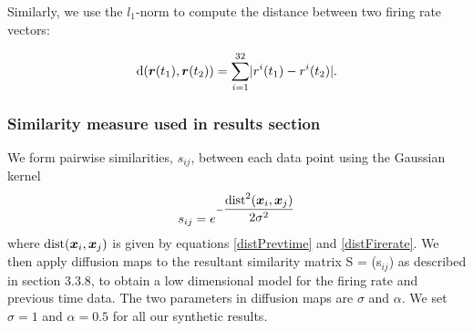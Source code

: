 Similarly, we use the $l_{1}$-norm to compute the distance between two firing rate vectors:

\begin{equation}\label{distFirerate}
\text{d}(\boldsymbol{r}(t_{1}), \boldsymbol{r}(t_{2}) ) = 
\displaystyle \sum_{i=1}^{32} \lvert r^{i}(t_{1}) - r^{i}(t_{2})   \rvert.
\end{equation}


\subsubsection{Similarity measure used in results section}
We form pairwise similarities, $s_{ij}$, between each data point
using the Gaussian kernel 
\[
s_{ij} = e^{-\dfrac{\text{dist}^{2}(\boldsymbol{x}_{i}, \boldsymbol{x}_{j})}{2\sigma^2}} 
\]
where $\text{dist}(\boldsymbol{x}_{i}, \boldsymbol{x}_{j})$ is given by equations
\eqref{distPrevtime} and \eqref{distFirerate}.
We then apply diffusion maps to the resultant similarity matrix S = (s$_{ij}$) 
as described in section 3.3.8, to obtain a low dimensional model for the 
firing rate and previous time data.
The two parameters in diffusion maps are $\sigma$ and $\alpha$.
We set $\sigma =1$ and $\alpha = 0.5$ for all our synthetic results.


























